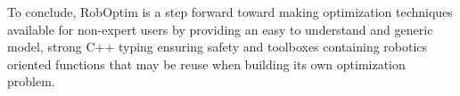 \documentclass[conference,final,a4paper,twocolumn,9pt]{IEEEtran}
\begin{document}
To conclude, RobOptim is a step forward toward making optimization
techniques available for non-expert users by providing an easy to
understand and generic model, strong C++ typing ensuring safety and
toolboxes containing robotics oriented functions that may be reuse
when building its own optimization problem.




\end{document}
